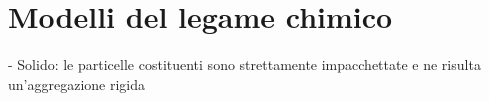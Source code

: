 \section{Modelli del legame chimico}
- Solido: le particelle costituenti sono strettamente impacchettate e ne risulta un'aggregazione rigida
